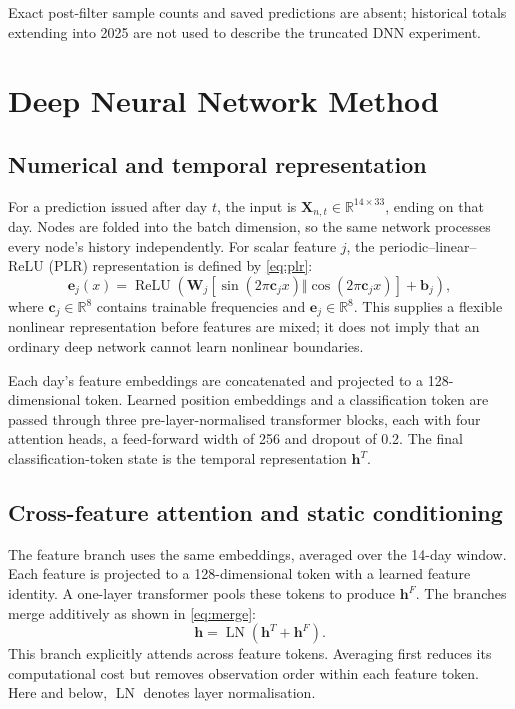 \documentclass[conference]{IEEEtran}
\begin{document}
Exact post-filter sample counts and saved predictions are absent; historical
totals extending into 2025 are not used to describe the truncated DNN experiment.

\section{Deep Neural Network Method}
\label{sec:method}
\subsection{Numerical and temporal representation}
For a prediction issued after day $t$, the input is
$\mathbf{X}_{n,t}\in\mathbb{R}^{14\times33}$, ending on that day. Nodes are
folded into the batch dimension, so the same network processes every node's
history independently. For scalar feature $j$, the periodic--linear--ReLU
(PLR) representation is defined by \eqref{eq:plr}:
\begin{equation}
\mathbf{e}_j(x)=\operatorname{ReLU}\!\left(
\mathbf{W}_j[\sin(2\pi\mathbf{c}_j x)\Vert
\cos(2\pi\mathbf{c}_j x)]+\mathbf{b}_j\right),
\label{eq:plr}
\end{equation}
where $\mathbf{c}_j\in\mathbb{R}^{8}$ contains trainable frequencies and
$\mathbf{e}_j\in\mathbb{R}^{8}$. This supplies a flexible nonlinear
representation before features are mixed; it does not imply that an ordinary
deep network cannot learn nonlinear boundaries.

Each day's feature embeddings are concatenated and projected to a 128-dimensional
token. Learned position embeddings and a classification token are passed through
three pre-layer-normalised transformer blocks, each with four attention heads,
a feed-forward width of 256 and dropout of 0.2. The final classification-token
state is the temporal representation $\mathbf{h}^{T}$.

\subsection{Cross-feature attention and static conditioning}
The feature branch uses the same embeddings, averaged over the 14-day window.
Each feature is projected to a 128-dimensional token with a learned feature
identity. A one-layer transformer pools these tokens to produce
$\mathbf{h}^{F}$. The branches merge additively as shown in \eqref{eq:merge}:
\begin{equation}
\mathbf{h}=\operatorname{LN}(\mathbf{h}^{T}+\mathbf{h}^{F}).
\label{eq:merge}
\end{equation}
This branch explicitly attends across feature tokens. Averaging first reduces
its computational cost but removes observation order within each feature token.
Here and below, $\operatorname{LN}$ denotes layer normalisation.
\end{document}
